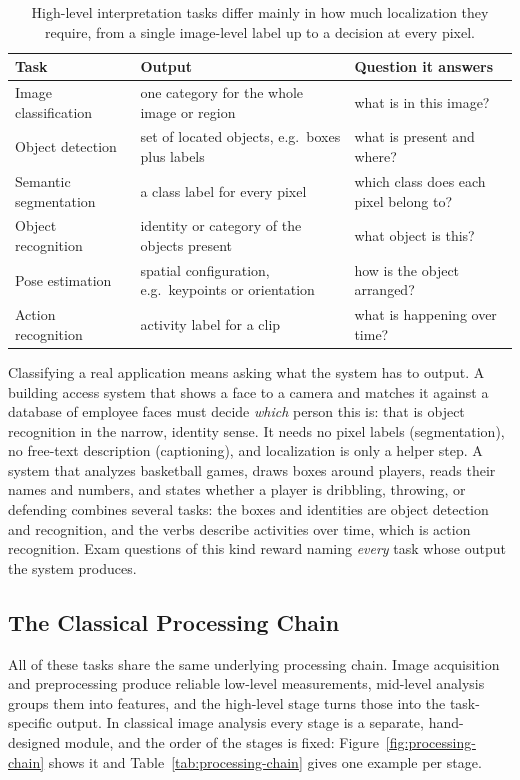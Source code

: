 \begin{table}[ht]
  \centering
  \begin{tabular}{@{}p{3.2cm}p{5.0cm}p{4.8cm}@{}}
    \toprule
    Task & Output & Question it answers \\
    \midrule
    Image classification & one category for the whole image or region &
      what is in this image? \\
    Object detection & set of located objects, e.g.\ boxes plus labels &
      what is present and where? \\
    Semantic segmentation & a class label for every pixel &
      which class does each pixel belong to? \\
    Object recognition & identity or category of the objects present &
      what object is this? \\
    Pose estimation & spatial configuration, e.g.\ keypoints or orientation &
      how is the object arranged? \\
    Action recognition & activity label for a clip &
      what is happening over time? \\
    \bottomrule
  \end{tabular}
  \caption{High-level interpretation tasks differ mainly in how much
  localization they require, from a single image-level label up to a decision at
  every pixel.}
\end{table}

\noindent
Classifying a real application means asking what the system has to output. A
building access system that shows a face to a camera and matches it against a
database of employee faces must decide \emph{which} person this is: that is
object recognition in the narrow, identity sense. It needs no pixel labels
(segmentation), no free-text description (captioning), and localization is only
a helper step. A system that analyzes basketball games, draws boxes around
players, reads their names and numbers, and states whether a player is
dribbling, throwing, or defending combines several tasks: the boxes and
identities are object detection and recognition, and the verbs describe
activities over time, which is action recognition. Exam questions of this kind
reward naming \emph{every} task whose output the system produces.

\subsection{The Classical Processing Chain}

All of these tasks share the same underlying processing chain. Image acquisition
and preprocessing produce reliable low-level measurements, mid-level analysis
groups them into features, and the high-level stage turns those into the
task-specific output. In classical image analysis every stage is a separate,
hand-designed module, and the order of the stages is fixed:
Figure~\ref{fig:processing-chain} shows it and Table~\ref{tab:processing-chain}
gives one example per stage.

